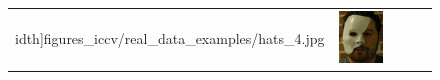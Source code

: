 \begin{figure}
\begin{tabular}{ccccc}
idth]{figures_iccv/real_data_examples/hats_4.jpg} & \includegraphics[width=\imagewidth]{figures_iccv/real_data_examples/disguise_4.jpg} \\

\end{tabular}
\end{figure}
